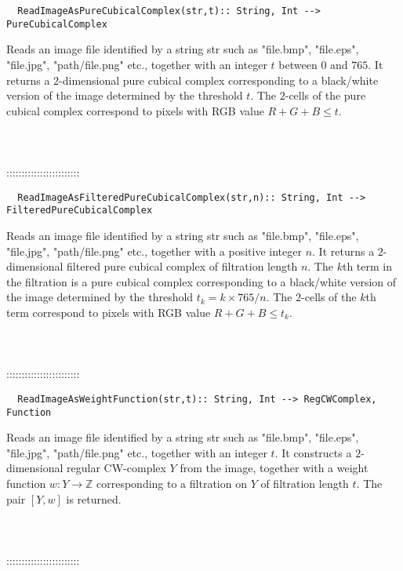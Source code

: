 \documentclass[a4paper,11pt]{report}
\begin{document}
{\begin{verbatim}  ReadImageAsPureCubicalComplex(str,t):: String, Int --> PureCubicalComplex
\end{verbatim}


 

 Reads an image file identified by a string str such as "file.bmp", "file.eps",
"file.jpg", "path/file.png" etc., together with an integer $t$ between $0$ and $765$. It returns a $2$-dimensional pure cubical complex corresponding to a black/white version of
the image determined by the threshold $t$. The $2$-cells of the pure cubical complex correspond to pixels with RGB value $R+G+B \le t$. \\
 \\
 \\
 \\
 ::::::::::::::::::::::::\\
 
\begin{verbatim}  ReadImageAsFilteredPureCubicalComplex(str,n):: String, Int --> FilteredPureCubicalComplex
\end{verbatim}


 

 Reads an image file identified by a string str such as "file.bmp", "file.eps",
"file.jpg", "path/file.png" etc., together with a positive integer $n$. It returns a $2$-dimensional filtered pure cubical complex of filtration length $n$. The $k$th term in the filtration is a pure cubical complex corresponding to a
black/white version of the image determined by the threshold $t_k=k \times 765/n $. The $2$-cells of the $k$th term correspond to pixels with RGB value $R+G+B \le t_k$. \\
 \\
 \\
 \\
 ::::::::::::::::::::::::\\
 
\begin{verbatim}  ReadImageAsWeightFunction(str,t):: String, Int --> RegCWComplex, Function
\end{verbatim}


 

 Reads an image file identified by a string str such as "file.bmp", "file.eps",
"file.jpg", "path/file.png" etc., together with an integer $t$. It constructs a $2$-dimensional regular CW-complex $Y$ from the image, together with a weight function $w\colon Y\rightarrow \mathbb Z$ corresponding to a filtration on $Y$ of filtration length $t$. The pair $[Y,w]$ is returned. \\
 \\
 \\
 \\
 ::::::::::::::::::::::::\\
 
}
\end{document}
